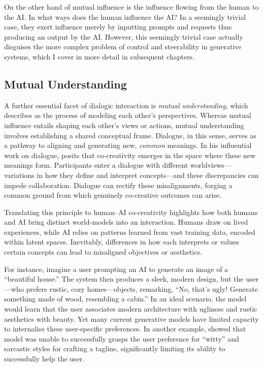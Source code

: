 On the other hand of mutual influence is the influence flowing from the human to the AI. In what ways does the human influence the AI? In a seemingly trivial case, they exert influence merely by inputting prompts and requests thus producing an output by the AI. However, this seemingly trivial case actually disguises the more complex problem of control and steerability in generative systems, which I cover in more detail in subsequent chapters.

\subsection{Mutual Understanding}

A further essential facet of dialogic interaction is \textit{mutual understanding}, which \citet{Bohm1996-fo} describes as the process of modeling each other's perspectives. Whereas mutual influence entails shaping each other's views or actions, mutual understanding involves establishing a shared conceptual frame. Dialogue, in this sense, serves as a pathway to aligning and generating new, \textit{common} meanings. In his influential work on dialogue, \citet{Bohm1996-fo} posits that co-creativity emerges in the space where these new meanings form. Participants enter a dialogue with different worldviews—variations in how they define and interpret concepts—and these discrepancies can impede collaboration. Dialogue can rectify these misalignments, forging a common ground from which genuinely co-creative outcomes can arise.

Translating this principle to human–AI co-creativity highlights how both humans and AI bring distinct world-models into an interaction. Humans draw on lived experiences, while AI relies on patterns learned from vast training data, encoded within latent spaces. Inevitably, differences in how each interprets or values certain concepts can lead to misaligned objectives or aesthetics.

For instance, imagine a user prompting an AI to generate an image of a ``beautiful house.'' The system then produces a sleek, modern design, but the user—who prefers rustic, cozy homes—objects, remarking, ``No, that's ugly! Generate something made of wood, resembling a cabin.'' In an ideal scenario, the model would learn that the user associates modern architecture with ugliness and rustic aesthetics with beauty. Yet many current generative models have limited capacity to internalise these user-specific preferences. In another example, \citet{Bown2024-yx} showed that model was unable to successfully grasps the user preference for ``witty'' and sarcastic styles for crafting a tagline, significantly limiting its ability to successfully help the user. 

